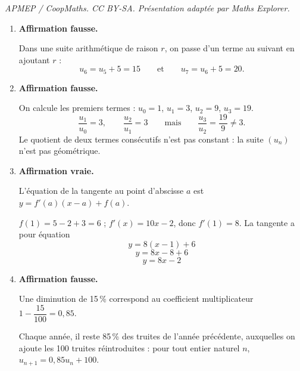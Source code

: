 \documentclass[10pt]{article}
\begin{document}
\noindent\textit{APMEP / CoopMaths. CC BY-SA. Présentation adaptée par Maths Explorer.}\par\medskip
\begin{enumerate}
	\item \textbf{Affirmation fausse.}

	Dans une suite arithmétique de raison $r$, on passe d'un terme au suivant en
	ajoutant $r$ :
	\[u_6 = u_5 + 5 = 15 \qquad\text{et}\qquad u_7 = u_6 + 5 = 20.\]

	\item \textbf{Affirmation fausse.}

	On calcule les premiers termes : $u_0 = 1$, $u_1 = 3$, $u_2 = 9$, $u_3 = 19$.
	\[\dfrac{u_1}{u_0} = 3, \qquad \dfrac{u_2}{u_1} = 3 \qquad
	\text{mais} \qquad \dfrac{u_3}{u_2} = \dfrac{19}{9} \neq 3.\]
	Le quotient de deux termes consécutifs n'est pas constant : la suite $(u_n)$ n'est pas géométrique.

	\item \textbf{Affirmation vraie.}

	L'équation de la tangente au point d'abscisse $a$ est $y = f'(a)(x - a) + f(a)$.

	$f(1) = 5 - 2 + 3 = 6$ ; $f'(x) = 10x - 2$, donc $f'(1) = 8$. La tangente a pour équation
	\[y = 8(x - 1) + 6 \]
	\[ y = 8x - 8 + 6 \]
	\[ y = 8x - 2\]

	\item \textbf{Affirmation fausse.}

	Une diminution de 15\,\% correspond au coefficient multiplicateur
	$1 - \dfrac{15}{100} = 0,85$.

	Chaque année, il reste 85\,\% des truites de l'année précédente, auxquelles on ajoute les
	100 truites réintroduites : pour tout entier naturel $n$, $u_{n+1} = 0,85u_n + 100$.
\end{enumerate}
\end{document}
